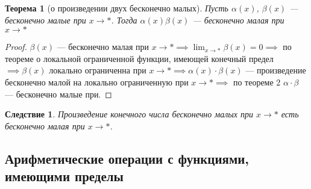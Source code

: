 \documentclass[a4paper,12pt]{article} %
\newtheorem{theorem}{Теорема}[section]
\newtheorem{corollary}{Следствие}[theorem]
\theoremstyle{remark}
\theoremstyle{definition}
\begin{document}
\begin{theorem}[о произведении двух бесконечно малых]
	Пусть $\alpha(x)$, $\beta(x)$ --- бесконечно малые при $x \to *$. Тогда $\alpha(x)\beta(x)$ --- бесконечно малая при $x \to *$
\end{theorem}
\begin{proof}
	$\beta(x)$ --- бесконечно малая при $x \to  * \implies \lim_{x \to *} \beta(x) = 0 \implies $ по теореме о локальной ограниченной функции, имеющей конечный предел $\implies \beta(x)$ локально ограниченна при $x\to * \implies \alpha(x)\cdot \beta(x)$ --- произведение бесконечно малой на локально ограниченную при $x\to * \implies$ по теореме 2 $\alpha\cdot \beta$ --- бесконечно малые при.
\end{proof}

\begin{corollary}
	Произведение конечного числа бесконечно малых при $x \to  *$ есть бесконечно малая при $x \to *$.
\end{corollary}

\subsection{Арифметические операции с функциями, имеющими пределы}
\end{document}
